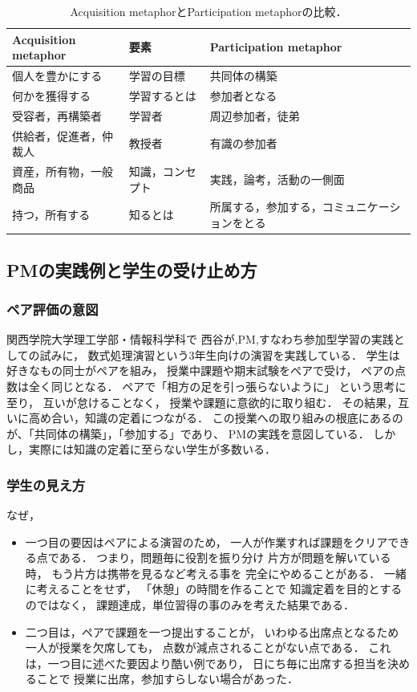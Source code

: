 \documentclass{hissymp}
\begin{document}
\begin{table}[bt]
\caption{\label{tab:orgc192b69}
Acquisition metaphorとParticipation metaphorの比較．}
\centering
\begin{tabular}{lll}
\hline
Acquisition metaphor & 要素 & Participation metaphor\\
\hline
個人を豊かにする & 学習の目標 & 共同体の構築\\
何かを獲得する & 学習するとは & 参加者となる\\
受容者，再構築者 & 学習者 & 周辺参加者，徒弟\\
供給者，促進者，仲裁人 & 教授者 & 有識の参加者\\
資産，所有物，一般商品 & 知識，コンセプト & 実践，論考，活動の一側面\\
持つ，所有する & 知るとは & 所属する，参加する，コミュニケーションをとる\\
\hline
\end{tabular}
\end{table}

\subsection{PMの実践例と学生の受け止め方}
\label{sec:orged5fd27}
\subsubsection{ペア評価の意図}
\label{sec:org99eff89}
関西学院大学理工学部・情報科学科で
西谷が,PM,すなわち参加型学習の実践としての試みに，
数式処理演習という3年生向けの演習を実践している．
学生は好きなもの同士がペアを組み，
授業中課題や期末試験をペアで受け，
ペアの点数は全く同じとなる．
ペアで「相方の足を引っ張らないように」
という思考に至り，
互いが怠けることなく，
授業や課題に意欲的に取り組む．
その結果，互いに高め合い，知識の定着につながる．
この授業への取り組みの根底にあるのが、「共同体の構築」，「参加する」であり、
PMの実践を意図している．
しかし，実際には知識の定着に至らない学生が多数いる．
\subsubsection{学生の見え方}
\label{sec:orga9a617e}
なぜ，
\begin{itemize}
\item 一つ目の要因はペアによる演習のため，
一人が作業すれば課題をクリアできる点である．
つまり，問題毎に役割を振り分け 
片方が問題を解いている時，
もう片方は携帯を見るなど考える事を
完全にやめることがある．
一緒に考えることをせず，
「休憩」の時間を作ることで
知識定着を目的とするのではなく，
課題達成，単位習得の事のみを考えた結果である．

\item 二つ目は，ペアで課題を一つ提出することが，
いわゆる出席点となるため
一人が授業を欠席しても，
点数が減点されることがない点である．
これは，一つ目に述べた要因より酷い例であり，
日にち毎に出席する担当を決めることで
授業に出席，参加すらしない場合があった．
\end{itemize}
\end{document}
